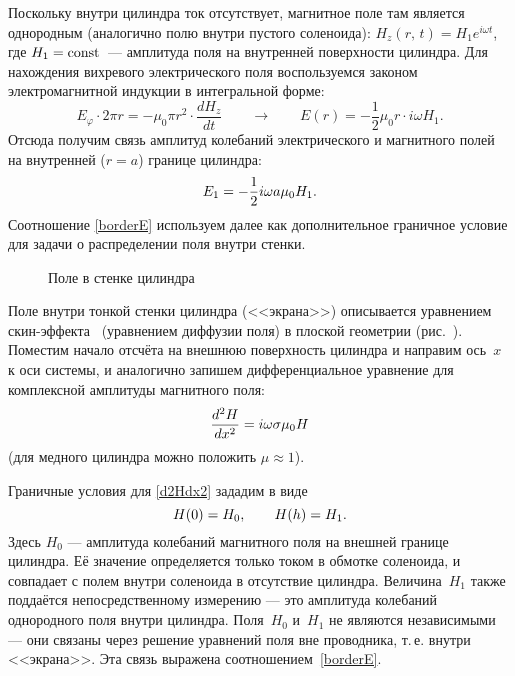 Поскольку внутри цилиндра ток отсутствует, магнитное поле там является
однородным (аналогично полю внутри пустого соленоида):
$H_z(r,\,t)=H_1 e^{i\omega t}$, где $H_1=\mathrm{const}$~--- амплитуда поля на внутренней
поверхности цилиндра. Для нахождения вихревого электрического поля
воспользуемся законом электромагнитной индукции  в интегральной
форме:
\[
E_{\varphi}\cdot 2\pi r = -\mu_0 \pi r^2 \cdot \frac{dH_z}{dt}\qquad
\to
\qquad
E(r) = -\frac12 \mu_0 r \cdot i\omega H_1.
\]
Отсюда получим связь амплитуд колебаний электрического и магнитного полей
на внутренней ($r=a$) границе цилиндра:
\begin{equation}\eqmark{borderE}
E_1 = -\frac12  i\omega a\mu_0 H_1.
\end{equation}
Соотношение \eqref{borderE} используем далее как дополнительное граничное
условие для задачи о распределении поля внутри стенки.

\begin{wrapfigure}{o}{0.27\textwidth}
    \caption{Поле в стенке цилиндра}
\end{wrapfigure}
Поле внутри тонкой стенки цилиндра (<<экрана>>) описывается уравнением 
скин-эффекта~ (уравнением диффузии поля) в плоской геометрии
(рис.~).
Поместим начало отсчёта на внешнюю поверхность цилиндра и направим ось~$x$
к оси системы, и аналогично 
запишем дифференциальное уравнение для комплексной амплитуды магнитного поля:
\begin{equation}\eqmark{d2Hdx2}
\frac{d^2H}{dx^2} = i\omega \sigma \mu_0 H
\end{equation}
(для медного цилиндра можно положить $\mu\approx 1$).

Граничные условия для \eqref{d2Hdx2} зададим в виде
\begin{equation}\eqmark{borderH}
H(0) = H_0,\qquad H(h) = H_1.
\end{equation}
Здесь $H_0$ --- амплитуда колебаний магнитного поля на внешней
границе цилиндра. Её значение определяется только током
в обмотке соленоида, и совпадает с полем внутри соленоида
в отсутствие цилиндра. Величина~$H_1$ также поддаётся непосредственному
измерению --- это амплитуда колебаний однородного поля внутри цилиндра.
Поля~$H_0$ и~$H_1$ не являются независимыми --- они связаны через
решение уравнений поля вне проводника, т.\,е. внутри <<экрана>>. Эта связь
выражена соотношением~\eqref{borderE}.


